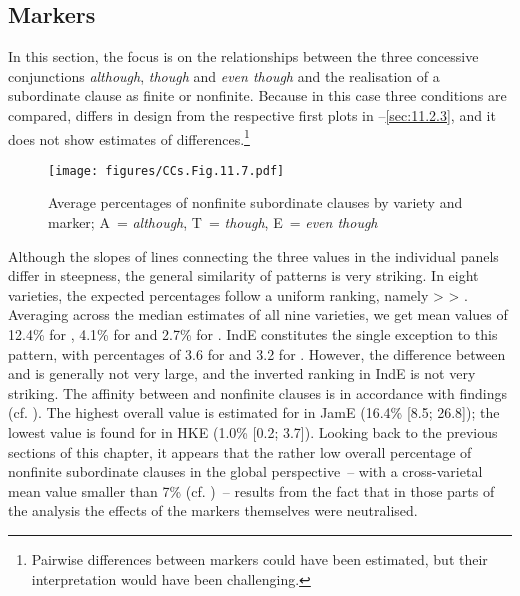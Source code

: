\subsection{\label{bkm:Ref75784179}Markers}\label{sec:11.2.4}

In this section, the focus is on the relationships between the three concessive conjunctions \textit{although}, \textit{though} and \textit{even though} and the realisation of a subordinate clause as finite or nonfinite. Because in this case three conditions are compared,  differs in design from the respective first plots in –\ref{sec:11.2.3}, and it does not show estimates of differences.\footnote{Pairwise differences between markers could have been estimated, but their interpretation would have been challenging.}

\vfill
\begin{figure}[H]
\texttt{[image: figures/CCs.Fig.11.7.pdf]}
\caption{\label{bkm:Ref75877064}\label{fig:11.7}Average percentages of nonfinite subordinate clauses by variety and marker; A~= \textit{although}, T~= \textit{though}, E~= \textit{even though}}
\end{figure}
\vfill\pagebreak

Although the slopes of lines connecting the three values in the individual panels differ in steepness, the general similarity of patterns is very striking. In eight varieties, the expected percentages follow a uniform ranking, namely  >  > . Averaging across the median estimates of all nine varieties, we get mean values of 12.4\% for , 4.1\% for  and 2.7\% for . IndE constitutes the single exception to this pattern, with percentages of 3.6 for  and 3.2 for . However, the difference between  and  is generally not very large, and the inverted ranking in IndE is not very striking. The affinity between  and nonfinite clauses is in accordance with  findings (cf. ). The highest overall value is estimated for  in JamE (16.4\% [8.5; 26.8]); the lowest value is found for  in HKE (1.0\% [0.2; 3.7]). Looking back to the previous sections of this chapter, it appears that the rather low overall percentage of nonfinite subordinate clauses in the global perspective~– with a cross-varietal mean value smaller than 7\% (cf. )~– results from the fact that in those parts of the analysis the effects of the markers themselves were neutralised.

